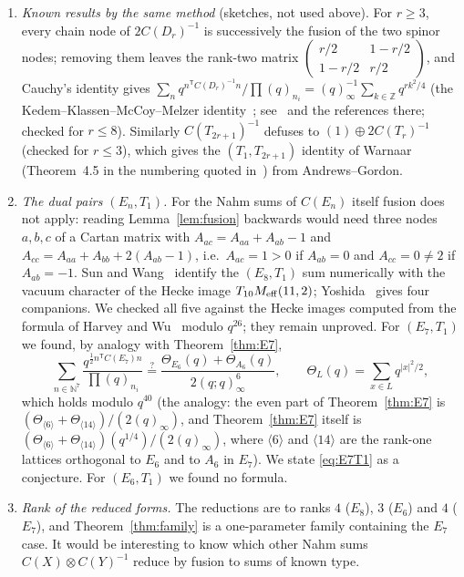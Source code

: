 \documentclass[11pt]{amsart}
\theoremstyle{definition}
\numberwithin{equation}{section}
\newcommand{\Z}{\mathbb{Z}}
\newcommand{\N}{\mathbb{N}}
\newcommand{\T}{\mathsf T}
\begin{document}
\begin{enumerate}[leftmargin=2em]
\item \emph{Known results by the same method} (sketches, not used above). For $r\ge3$, every chain node of
$2C(D_r)^{-1}$ is successively the fusion of the two spinor nodes; removing them leaves the rank-two matrix
$\left(\begin{smallmatrix}r/2&1-r/2\\1-r/2&r/2\end{smallmatrix}\right)$, and Cauchy's identity gives
$\sum_nq^{n^{\T}C(D_r)^{-1}n}/\prod(q)_{n_i}=(q)_\infty^{-1}\sum_{k\in\Z}q^{rk^2/4}$ (the
Kedem--Klassen--McCoy--Melzer identity~\cite{KKMM1}; see~\cite[Theorem~1.2]{WW-Dk} and the references
there; checked for $r\le8$).
Similarly $C(T_{2r+1})^{-1}$ defuses to $(1)\oplus2C(T_r)^{-1}$ (checked for $r\le3$), which gives the
$(T_1,T_{2r+1})$ identity of Warnaar~\cite[Theorem~4.2]{Warnaar03} (Theorem~4.5 in the numbering quoted
in~\cite{SW}) from Andrews--Gordon.
\item \emph{The dual pairs $(E_n,T_1)$.} For the Nahm sums of $C(E_n)$ itself fusion does not apply: reading
Lemma~\ref{lem:fusion} backwards would need three nodes $a,b,c$ of a Cartan matrix with
$A_{ac}=A_{aa}+A_{ab}-1$ and $A_{cc}=A_{aa}+A_{bb}+2(A_{ab}-1)$, i.e.\ $A_{ac}=1>0$ if $A_{ab}=0$ and
$A_{cc}=0\ne2$ if $A_{ab}=-1$. Sun and Wang~\cite[(3.21)]{SW} identify the $(E_8,T_1)$ sum numerically with the vacuum
character of the Hecke image $T_{10}M_{\rm eff}(11,2)$; Yoshida~\cite{Yoshida} gives four companions. We
checked all five against the Hecke images computed from the formula of Harvey and Wu~\cite{HW} modulo
$q^{26}$; they remain unproved. For $(E_7,T_1)$ we found, by analogy with Theorem~\ref{thm:E7},
\begin{equation}\label{eq:E7T1}
\sum_{n\in\N^7}\frac{q^{\frac12n^{\T}C(E_7)n}}{\prod(q)_{n_i}}\overset{?}{=}\frac{\Theta_{E_6}(q)+\Theta_{A_6}(q)}{2(q;q)_\infty^6},
\qquad\Theta_L(q)=\sum_{x\in L}q^{|x|^2/2},
\end{equation}
which holds modulo $q^{40}$ (the analogy: the even part of Theorem~\ref{thm:E7} is
$(\Theta_{\langle6\rangle}+\Theta_{\langle14\rangle})/(2(q)_\infty)$, and Theorem~\ref{thm:E7} itself is
$(\Theta_{\langle6\rangle}+\Theta_{\langle14\rangle})(q^{1/4})/(2(q)_\infty)$, where $\langle6\rangle$ and $\langle14\rangle$
are the rank-one lattices orthogonal to $E_6$ and to $A_6$ in $E_7$). We state \eqref{eq:E7T1} as a conjecture. For $(E_6,T_1)$ we found no formula.
\item \emph{Rank of the reduced forms.} The reductions are to ranks $4$ ($E_8$), $3$ ($E_6$) and $4$ ($E_7$),
and Theorem~\ref{thm:family} is a one-parameter family containing the $E_7$ case. It would be interesting
to know which other Nahm sums $C(X)\otimes C(Y)^{-1}$ reduce by fusion to sums of known type.
\end{enumerate}
\end{document}
